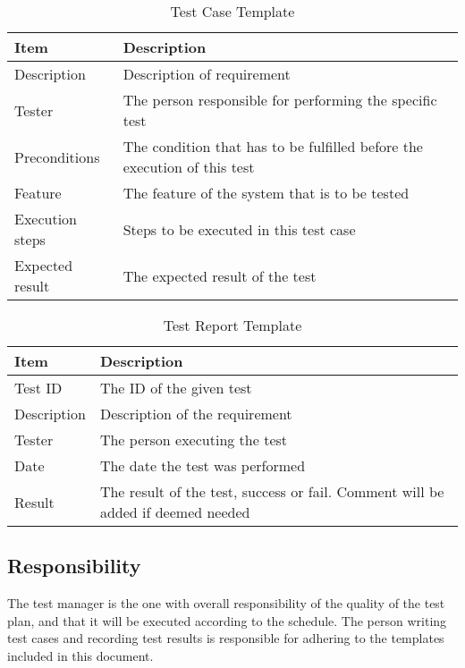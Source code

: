\begin{table}
\caption{Test Case Template}
\centering
\begin{tabular}{ l l }
\hline
 Item            & Description                                                              \\ 
\hline
 Description     & Description of requirement                                               \\ 
 Tester          & The person responsible for performing the specific test                  \\ 
 Preconditions   & The condition that has to be fulfilled before the execution of this test \\ 
 Feature         & The feature of the system that is to be tested                           \\ 
 Execution steps & Steps to be executed in this test case                                   \\ 
 Expected result & The expected result of the test                                          \\
\hline
\end{tabular}
\label{table:testcase}
\end{table}

\begin{table}
\caption{Test Report Template}
\centering
\begin{tabular}{ l l }
\hline
Item        & Description                             \\ 
\hline
Test ID     & The ID of the given test                \\ 
Description & Description of the requirement          \\ 
Tester      & The person executing the test           \\ 
Date        & The date the test was performed         \\ 
Result      & The result of the test, success or fail. Comment will be added if deemed needed \\
\hline
\end{tabular}
\label{table:testreport}
\end{table}

\subsection{Responsibility}
The test manager is the one with overall responsibility of the quality of the test plan, and that it will be executed according to the schedule. The person writing test cases and recording test results is responsible for adhering to the templates included in this document.

